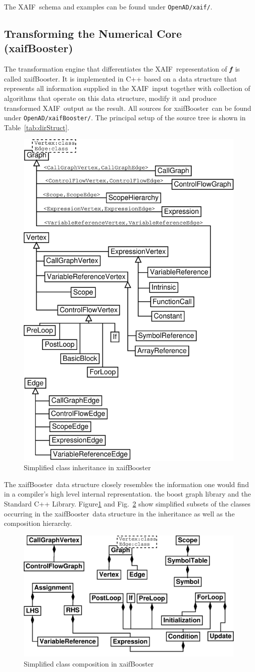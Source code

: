 \documentclass{book}
\newcommand{\xaif}{XAIF}
\newcommand{\xaifBooster}{xaifBooster}
\newcommand{\bmf}{\mbox{\bf\em f}}
\newcommand{\code}[1]{{\small\tt{#1}}}
\newcommand{\reffig}[1]{{Fig.~\ref{#1}}}
\newcommand{\reffigBS}[1]{{Figure\ref{#1}}}
\newcommand{\reftab}[1]{{Table~\ref{#1}}}
\begin{document}
The \xaif\ schema and examples can be found under \code{OpenAD/xaif/}.

\subsection{Transforming the Numerical Core (\xaifBooster)} \label{sssec:xaifBooster}
The transformation engine that differentiates the \xaif\ representation of 
$\bmf$ is called \xaifBooster. It is implemented in C++ based on a 
data structure that represents all information supplied in the \xaif\ input 
together with collection of algorithms that operate on this data structure, modify 
it and produce transformed \xaif\ output as the result. All sources for \xaifBooster\ can be found under \code{OpenAD/xaifBooster/}. The principal setup of the source tree is shown in \reftab{tab:dirStruct}.
\begin{figure}
  \centering \includegraphics[width=.45\textwidth]{irInh}
  \caption{Simplified class inheritance in \xaifBooster} \label{fig:iri}
\end{figure}
The \xaifBooster\ data structure  
closely resembles the information one would find in a 
compiler's high level internal representation. 
the boost graph library \cite{boostWeb}
and the Standard C++ Library\cite{libstdcWeb}.
\reffigBS{fig:iri} and \reffig{fig:irc} show simplified subsets of the classes 
occurring in the \xaifBooster\ data structure in the inheritance 
as well as the composition hierarchy.  
\begin{figure}[htb]
  \centering \includegraphics[width=.45\textwidth]{irComp}
  \caption{Simplified class composition in \xaifBooster} \label{fig:irc}
\end{figure}
\end{document}
